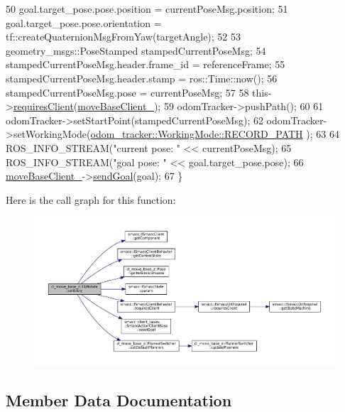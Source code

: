 \begin{DoxyCode}
50     goal.target\_pose.pose.position = currentPoseMsg.position;
51     goal.target\_pose.pose.orientation = tf::createQuaternionMsgFromYaw(targetAngle);
52 
53     geometry\_msgs::PoseStamped stampedCurrentPoseMsg;
54     stampedCurrentPoseMsg.header.frame\_id = referenceFrame;
55     stampedCurrentPoseMsg.header.stamp = ros::Time::now();
56     stampedCurrentPoseMsg.pose = currentPoseMsg;
57 
58     this->\hyperlink{classsmacc_1_1ISmaccClientBehavior_a32b16e99e3b4cb289414203dc861a440}{requiresClient}(\hyperlink{classcl__move__base__z_1_1CbRotate_a390623f5bcbdad18fe2a65428e4621cb}{moveBaseClient\_});
59     odomTracker->pushPath();
60 
61     odomTracker->setStartPoint(stampedCurrentPoseMsg);
62     odomTracker->setWorkingMode(\hyperlink{namespacecl__move__base__z_1_1odom__tracker_ac46b05813b2791604f6cd0a39ace3ef8a023bc3adf68871ef7a0c616765ac80a7}{odom\_tracker::WorkingMode::RECORD\_PATH}
      );
63 
64     ROS\_INFO\_STREAM(\textcolor{stringliteral}{"current pose: "} << currentPoseMsg);
65     ROS\_INFO\_STREAM(\textcolor{stringliteral}{"goal pose: "} << goal.target\_pose.pose);
66     \hyperlink{classcl__move__base__z_1_1CbRotate_a390623f5bcbdad18fe2a65428e4621cb}{moveBaseClient\_}->\hyperlink{classsmacc_1_1client__bases_1_1SmaccActionClientBase_a9c47a5094ac8afb01680307fe5eca922}{sendGoal}(goal);
67 \}
\end{DoxyCode}
Here is the call graph for this function\+:
\nopagebreak
\begin{figure}[H]
\begin{center}
\leavevmode
\includegraphics[width=350pt]{classcl__move__base__z_1_1CbRotate_a316ee51ecfd3f10fd1edae0d7d3b26c0_cgraph}
\end{center}
\end{figure}


\subsection{Member Data Documentation}
\mbox{\label{classcl__move__base__z_1_1CbRotate_a2b57c5f392fde0a3bf38f5fd6e1bde11}} 
